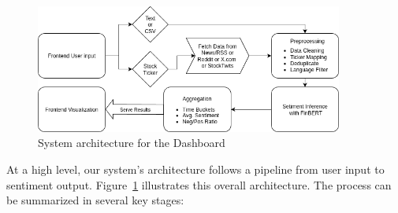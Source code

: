 \documentclass[12pt]{article}
\begin{document}
\begin{figure}[h!]
  \centering
  \includegraphics[width=0.9\textwidth]{system-logic.png}
  \caption{System architecture for the Dashboard}
  \label{fig:arch}
\end{figure}

At a high level, our system's architecture follows a pipeline from user input to sentiment output.
Figure~\ref{fig:arch} illustrates this overall architecture. The process can be summarized in several key
stages:
\end{document}

